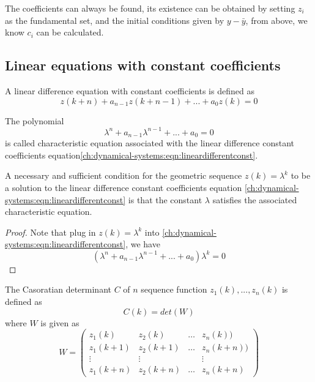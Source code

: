 \begin{refsection}
\begin{remark}
The coefficients can always be found, its existence can be obtained by setting $z_i$ as the fundamental set, and the initial conditions given by $y-\bar{y}$, from above, we know $c_i$ can be calculated. 
\end{remark}

\subsection{Linear equations with constant coefficients}


\begin{definition}
A linear difference equation with constant coefficients is defined as
\begin{equation}\label{ch:dynamical-systems:eqn:lineardifferentconst}
    z(k+n) + a_{n-1}z(k+n-1) + ... + a_0z(k) = 0
\end{equation}

\end{definition}


\begin{definition}
The polynomial 
$$\lambda^n + a_{n-1}\lambda^{n-1} + ... + a_0 = 0$$
is called characteristic equation associated with the linear difference constant coefficients equation\autoref{ch:dynamical-systems:eqn:lineardifferentconst}. 
\end{definition}


\begin{theorem}\cite[32]{luenberger1979introduction}
A necessary and sufficient condition for the geometric sequence $z(k) = \lambda^k$ to be a solution to the linear difference constant coefficients equation \autoref{ch:dynamical-systems:eqn:lineardifferentconst} is that the constant $\lambda$ satisfies the associated characteristic equation.
\end{theorem}
\begin{proof}
Note that plug in $z(k) = \lambda^k$ into \autoref{ch:dynamical-systems:eqn:lineardifferentconst}, we have
$$(\lambda^n + a_{n-1}\lambda^{n-1} + ... + a_0)\lambda^k = 0$$
\end{proof}


\begin{definition}\cite[149]{jerri2013linear}
The Casoratian determinant $C$ of $n$ sequence function $z_1(k),...,z_n(k)$ is defined as $$C(k) = det(W)$$
where $W$ is given as
$$W=\begin{pmatrix}
z_1(k) & z_2(k) & \dots & z_n(k))\\ 
z_1(k+1) & z_2(k+1) & \dots & z_n(k+n))\\ 
\vdots & \vdots &  & \vdots \\ 
z_1(k+n) & z_2(k+n) & \dots & z_n(k+n)
\end{pmatrix}$$
\end{definition}





\end{refsection}
